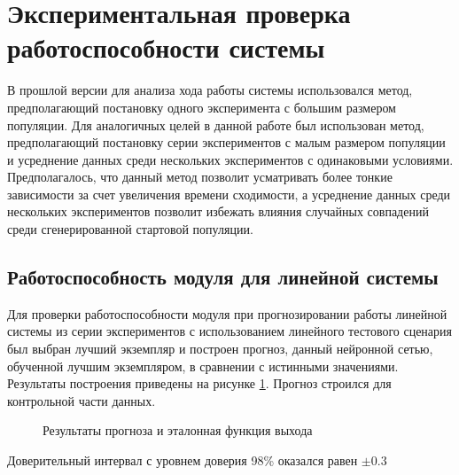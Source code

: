 \documentclass[utf8,usehyperref,14pt]{G7-32}
\begin{document}
\section{Экспериментальная проверка работоспособности системы}
В прошлой версии для анализа хода работы системы использовался метод, предполагающий постановку одного эксперимента с большим размером популяции. Для аналогичных целей в данной работе был использован метод, предполагающий постановку серии экспериментов с малым размером популяции и усреднение данных среди нескольких экспериментов с одинаковыми условиями. Предполагалось, что данный метод позволит усматривать более тонкие зависимости за счет увеличения времени сходимости, а усреднение данных среди нескольких экспериментов позволит избежать влияния случайных совпадений среди сгенерированной стартовой популяции. \cite{SelfSystems}
\subsection{Работоспособность модуля для линейной системы}
Для проверки работоспособности модуля при прогнозировании работы линейной системы из серии экспериментов с использованием линейного тестового сценария был выбран лучший экземпляр и построен прогноз, данный нейронной сетью, обученной лучшим экземпляром, в сравнении с истинными значениями. Результаты построения приведены на рисунке \ref{linear_work}. Прогноз строился для контрольной части данных.
\begin{figure}[H]
 
  \caption{Результаты прогноза и эталонная функция выхода}\label{linear_work}
\end{figure}
Доверительный интервал с уровнем доверия 98\% оказался равен $ \pm 0.3 $
\end{document}

